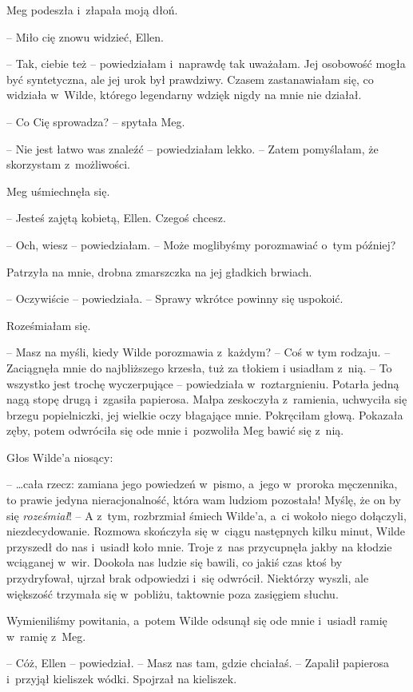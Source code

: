\documentclass[oneside,polish,11pt,sfheadings]{mwbk}
\begin{document}
Meg podeszła i~złapała moją dłoń.

-- Miło cię znowu widzieć, Ellen.

-- Tak, ciebie też -- powiedziałam i~naprawdę tak uważałam. Jej osobowość
mogła być syntetyczna, ale jej urok był prawdziwy. Czasem zastanawiałam
się, co widziała w~Wilde, którego legendarny wdzięk nigdy na mnie nie
działał.

-- Co Cię sprowadza? -- spytała Meg.

-- Nie jest łatwo was znaleźć -- powiedziałam lekko. -- Zatem pomyślałam,
że skorzystam z~możliwości.

Meg uśmiechnęła się. 

-- Jesteś zajętą kobietą, Ellen. Czegoś chcesz.

-- Och, wiesz -- powiedziałam. -- Może moglibyśmy porozmawiać o~tym
później?

Patrzyła na mnie, drobna zmarszczka na jej gładkich brwiach.

-- Oczywiście -- powiedziała. -- Sprawy wkrótce powinny się uspokoić.

Roześmiałam się. 

-- Masz na myśli, kiedy Wilde porozmawia z~każdym? -- Coś
w tym rodzaju. -- Zaciągnęła mnie do najbliższego krzesła, tuż za tłokiem
i usiadłam z~nią. -- To wszystko jest trochę wyczerpujące -- powiedziała w~roztargnieniu. Potarła jedną nagą stopę drugą i~zgasiła papierosa. Małpa
zeskoczyła z~ramienia, uchwyciła się brzegu popielniczki, jej wielkie
oczy błagające mnie. Pokręciłam głową. Pokazała zęby, potem odwróciła
się ode mnie i~pozwoliła Meg bawić się z~nią.

Głos Wilde'a niosący:

-- \ldots  cała rzecz: zamiana jego powiedzeń w~pismo, a~jego w~proroka
męczennika, to prawie jedyna nieracjonalność, która wam ludziom
pozostała! Myślę, że on by się \textit{roześmiał}! -- A z~tym, rozbrzmiał
śmiech Wilde'a, a~ci wokoło niego dołączyli, niezdecydowanie. Rozmowa
skończyła się w~ciągu następnych kilku minut, Wilde przyszedł do nas i~usiadł koło mnie. Troje z~nas przycupnęła jakby na kłodzie wciąganej w~wir. Dookoła nas ludzie się bawili, co jakiś czas ktoś by przydryfował,
ujrzał brak odpowiedzi i~się odwrócił. Niektórzy wyszli, ale większość
trzymała się w~pobliżu, taktownie poza zasięgiem słuchu.

Wymieniliśmy powitania, a~potem Wilde odsunął się ode mnie i~usiadł
ramię w~ramię z~Meg.

-- Cóż, Ellen -- powiedział. -- Masz nas tam, gdzie chciałaś. -- Zapalił
papierosa i~przyjął kieliszek wódki. Spojrzał na kieliszek. 
\end{document}
